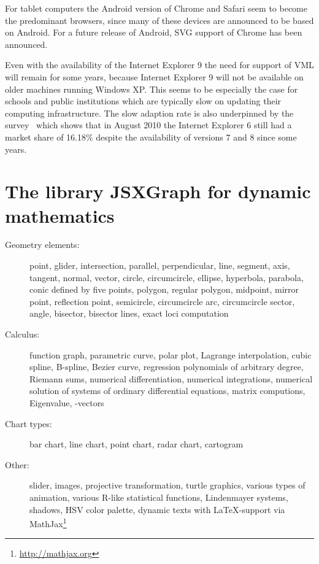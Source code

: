 \documentclass[12pt,a4paper]{article}%
\begin{document}
For tablet computers the Android version of Chrome and Safari seem to become the
predominant browsers, since many of these devices are announced to be based on Android.
For a future release of Android, SVG support of Chrome has been announced.

Even with the availability of the Internet Explorer 9 the need for support of
VML will remain for some years, because Internet Explorer 9 will not be available 
on older machines running Windows XP.
This seems to be especially the case for schools and public institutions which are
typically slow on updating their computing infrastructure. 
The slow adaption rate is also underpinned by the survey~\cite{netapplications} which
shows that in August 2010 the Internet Explorer 6 still had a market share of 16.18\%
despite the availability of versions 7 and 8 since some years.


\section{The library JSXGraph for dynamic mathematics}



\begin{description}
\item[Geometry elements:]
point, glider, intersection, parallel, perpendicular,
line, segment, axis, tangent, normal, vector,
circle, circumcircle, ellipse, hyperbola, parabola, conic defined by five points,
polygon, regular polygon, 
midpoint, mirror point, reflection point, 
semicircle, circumcircle arc, circumcircle sector,
angle, bisector, bisector lines,
exact loci computation
\item[Calculus:]
function graph, parametric curve, polar plot, 
Lagrange interpolation, cubic spline, B-spline, Bezier curve,
regression polynomials of arbitrary degree, 
Riemann sums, 
numerical differentiation, numerical integrations,
numerical solution of systems of ordinary differential equations,
matrix computions,
Eigenvalue, -vectors
\item[Chart types:]
bar chart, line chart, point chart, radar chart, cartogram
\item[Other:]
slider, images, 
projective transformation, turtle graphics, various types of animation,
various R-like statistical functions, 
Lindenmayer systems, shadows, HSV color palette, 
dynamic texts with \LaTeX{}-support via MathJax\footnote{\href{http://mathjax.org}{http://mathjax.org}}
\end{description}
\end{document}
